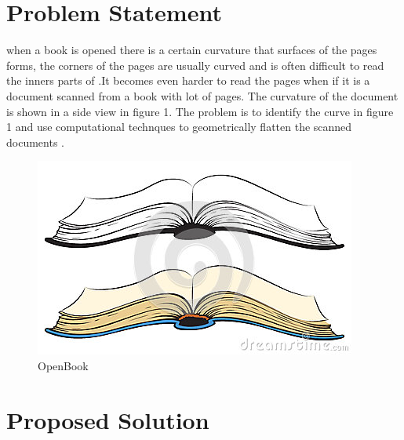 \documentclass[twocolumn,longbibliography]{revtex4-1}
\begin{document}
\section{Problem Statement}
when a book is opened there is a certain curvature that surfaces of the pages forms, the corners of the pages are usually curved and is often difficult to read the inners parts of .It becomes even harder to read the pages when if it is a document scanned from a book with lot of pages. The curvature of the document is shown in a side view in figure 1. The problem is to identify the curve in figure 1 and use computational technques to geometrically flatten the scanned documents .
\begin{figure}
  \centering
  \caption{OpenBook}
  \includegraphics[scale=5]{figure1.jpg} 
\end{figure}

\section{Proposed Solution}



\end{document}
